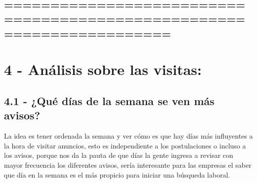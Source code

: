 \documentclass[11pt]{article}
\begin{document}
    \begin{center}
    \end{center}
    { \hspace*{\fill} \\}
    
    \hypertarget{section}{%
\subsection{======================================================================}\label{section}}

    \hypertarget{anuxe1lisis-sobre-las-visitas}{%
\section{4 - Análisis sobre las
visitas:}\label{anuxe1lisis-sobre-las-visitas}}

\hypertarget{quuxe9-duxedas-de-la-semana-se-ven-muxe1s-avisos}{%
\subsection{4.1 - ¿Qué días de la semana se ven más
avisos?}\label{quuxe9-duxedas-de-la-semana-se-ven-muxe1s-avisos}}

La idea es tener ordenada la semana y ver cómo es que hay días más
influyentes a la hora de visitar anuncios, esto es independiente a los
postulaciones o incluso a los avisos, porque nos da la pauta de que días
la gente ingresa a revisar con mayor frecuencia los diferentes avisos,
sería interesante para las empresas el saber que día en la semana es el
más propicio para iniciar una búsqueda laboral.
\end{document}
